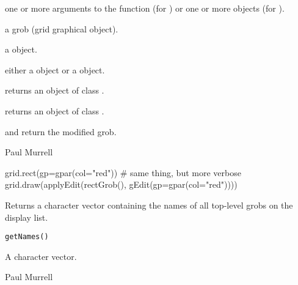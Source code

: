 %
\begin{Arguments}
\begin{ldescription}
\item[\code{...}]  one or more arguments to the  function
(for ) or one or more  objects
(for ).
\item[\code{x}]  a grob (grid graphical object).
\item[\code{edit}]  a  object.
\item[\code{edits}]  either a  object or a 
object.
\end{ldescription}
\end{Arguments}
%
\begin{Value}
 returns an object of class .

 returns an object of class .

 and  return the modified grob.
\end{Value}
%
\begin{Author}\relax
 Paul Murrell 
\end{Author}
%
\begin{SeeAlso}\relax
{}
\end{SeeAlso}
%
\begin{Examples}
\begin{ExampleCode}
grid.rect(gp=gpar(col="red"))
# same thing, but more verbose
grid.draw(applyEdit(rectGrob(), gEdit(gp=gpar(col="red"))))
\end{ExampleCode}
\end{Examples}
%
\begin{Description}\relax
Returns a character vector containing the names of all
top-level grobs on the display list.
\end{Description}
%
\begin{Usage}
\begin{verbatim}
getNames()
\end{verbatim}
\end{Usage}
%
\begin{Value}
A character vector.
\end{Value}
%
\begin{Author}\relax
 Paul Murrell 
\end{Author}
%
